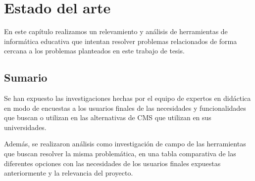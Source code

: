 \chapter{Estado del arte} %
En este capítulo realizamos un relevamiento y análisis de herramientas de informática educativa que intentan resolver problemas relacionados de forma cercana a los problemas planteados en este trabajo de tesis.

\label{capitulo3} %






\section{Sumario}
Se han expuesto las investigaciones hechas por el equipo de expertos en didáctica en modo de encuestas a los usuarios finales de las necesidades y funcionalidades que buscan o utilizan en las alternativas de CMS que utilizan en sus universidades. 

Además, se realizaron análisis como investigación de campo de las herramientas que buscan resolver la misma problemática, en una tabla comparativa de las diferentes opciones con las necesidades de los usuarios finales expuestas anteriormente y la relevancia del proyecto.